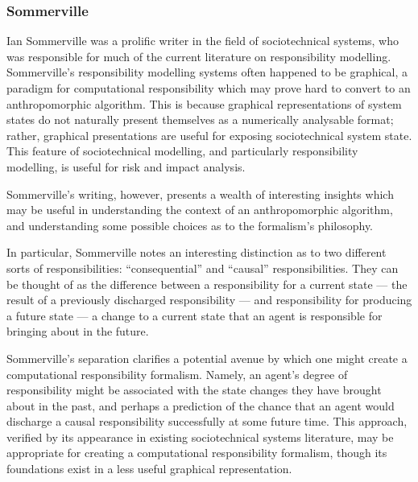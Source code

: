 \subsubsection{Sommerville\cite{sommerville_graphical_responsibility,sommerville_dependable_systems_chap_8,sommerville_dependable_systems_chapter_9}}
Ian Sommerville was a prolific writer in the field of sociotechnical systems, who was responsible for much of the current literature on responsibility modelling\cite{sommerville_graphical_responsibility,sommerville_dependable_systems_chap_8,sommerville_dependable_systems_chapter_9}. Sommerville's responsibility modelling systems often happened to be graphical\cite{sommerville_graphical_responsibility}, a paradigm for computational responsibility which may prove hard to convert to an anthropomorphic algorithm. This is because graphical representations of system states do not naturally present themselves as a numerically analysable format; rather, graphical presentations are useful for exposing sociotechnical system state. This feature of sociotechnical modelling, and particularly responsibility modelling, is useful for risk and impact analysis\cite{ObashiMethodology}.\par

Sommerville's writing, however, presents a wealth of interesting insights which may be useful in understanding the context of an anthropomorphic algorithm, and understanding some possible choices as to the formalism's philosophy.\par

In particular, Sommerville notes an interesting distinction as to two different sorts of responsibilities: ``consequential'' and ``causal'' responsibilities. They can be thought of as the difference between a responsibility for a current state --- the result of a previously discharged responsibility --- and responsibility for producing a future state --- a change to a current state that an agent is responsible for bringing about in the future.\par

Sommerville's separation clarifies a potential avenue by which one might create a computational responsibility formalism. Namely, an agent's degree of responsibility might be associated with the state changes they have brought about in the past, and perhaps a prediction of the chance that an agent would discharge a causal responsibility successfully at some future time. This approach, verified by its appearance in existing sociotechnical systems literature, may be appropriate for creating a computational responsibility formalism, though its foundations exist in a less useful graphical representation.\par

